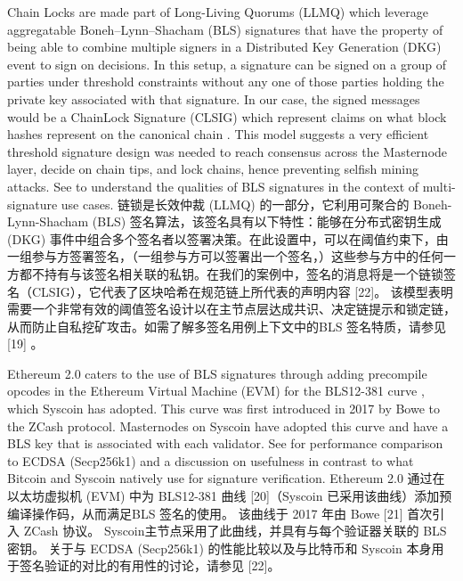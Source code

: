 \documentclass{ctexart}
\begin{document}
Chain Locks are made part of Long-Living Quorums (LLMQ) which leverage aggregatable Boneh–Lynn–Shacham (BLS) signatures that have the property of being able to combine multiple signers in a Distributed Key Generation (DKG) event to sign on decisions. In this setup, a signature can be signed on a group of parties under threshold constraints without any one of those parties holding the private key associated with that signature. In our case, the signed messages would be a ChainLock Signature (CLSIG) which represent claims on what block hashes represent on the canonical chain \cite{Blo18}. This model suggests a very efficient   threshold signature design was needed to reach consensus across the Masternode layer, decide on chain tips, and lock chains, hence preventing selfish mining attacks. See \cite{Bon18} to understand the qualities of BLS signatures in the context of multi-signature use cases. 链锁是长效仲裁 (LLMQ) 的一部分，它利用可聚合的 Boneh-Lynn-Shacham (BLS) 签名算法，该签名具有以下特性：能够在分布式密钥生成 (DKG) 事件中组合多个签名者以签署决策。在此设置中，可以在阈值约束下，由一组参与方签署签名，（一组参与方可以签署出一个签名，）这些参与方中的任何一方都不持有与该签名相关联的私钥。在我们的案例中，签名的消息将是一个链锁签名（CLSIG），它代表了区块哈希在规范链上所代表的声明内容 [22]。 该模型表明需要一个非常有效的阈值签名设计以在主节点层达成共识、决定链提示和锁定链，从而防止自私挖矿攻击。如需了解多签名用例上下文中的BLS 签名特质，请参见 [19] 。

Ethereum 2.0 caters to the use of BLS signatures through adding precompile opcodes in the Ethereum Virtual Machine (EVM) for the BLS12-381 curve \cite{Dra18}, which Syscoin has adopted. This curve was first introduced in 2017 by Bowe \cite{Bow17}  to the ZCash protocol. Masternodes on Syscoin have adopted this curve and have a BLS key that is associated with each validator. See \cite{Blo18} for performance comparison to ECDSA (Secp256k1) and a discussion on usefulness in contrast to what Bitcoin and Syscoin natively use for signature verification. Ethereum 2.0 通过在以太坊虚拟机 (EVM) 中为 BLS12-381 曲线 [20]（Syscoin 已采用该曲线）添加预编译操作码，从而满足BLS 签名的使用。 该曲线于 2017 年由 Bowe [21] 首次引入 ZCash 协议。 Syscoin主节点采用了此曲线，并具有与每个验证器关联的 BLS 密钥。 关于与 ECDSA (Secp256k1) 的性能比较以及与比特币和 Syscoin 本身用于签名验证的对比的有用性的讨论，请参见 [22]。
\end{document}
